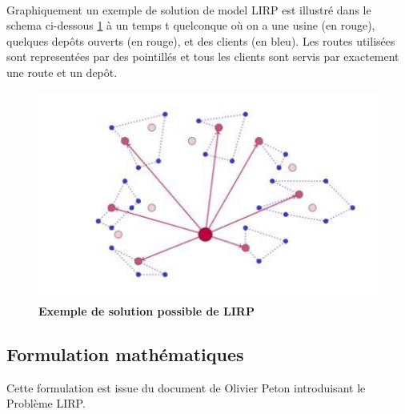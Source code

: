 \documentclass[a4paper,10pt]{article}
\begin{document}
\paragraph{}
Graphiquement un exemple de solution de model LIRP est illustré dans le schema ci-dessous \ref{Exemple} à un temps t quelconque où on a une usine (en rouge), quelques depôts ouverts (en rouge), 
et des clients (en bleu). Les routes utilisées sont representées par des pointillés et tous les clients sont servis par exactement une route et un depôt.
\begin{figure}[!]
\includegraphics{Fig1.jpg}
\caption{\label{Exemple} \textbf{Exemple de solution possible de LIRP \cite{}}}
\end{figure}

\newpage



\subsection{Formulation mathématiques}
Cette formulation est issue du document de Olivier Peton \cite{} introduisant le Problème LIRP.
\end{document}
